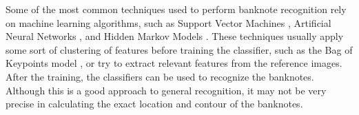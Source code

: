 Some of the most common techniques used to perform banknote recognition rely on machine learning algorithms, such as Support Vector Machines \iftoggle{ebib}{\cite{Yeh2011,Chang2007,Sun2008A}}{\cite{Yeh2011}}, Artificial Neural Networks \iftoggle{ebib}{\cite{Lee2004,Gai2013,Sun2008B}}{\cite{Gai2013}}, and Hidden Markov Models \iftoggle{ebib}{\cite{Hassanpour2009,Shan2009}}{\cite{Hassanpour2009}}. These techniques usually apply some sort of clustering of features before training the classifier, such as the Bag of Keypoints model \cite{Csurka2004}, or try to extract relevant features from the reference images. After the training, the classifiers can be used to recognize the banknotes. Although this is a good approach to general recognition, it may not be very precise in calculating the exact location and contour of the banknotes.
